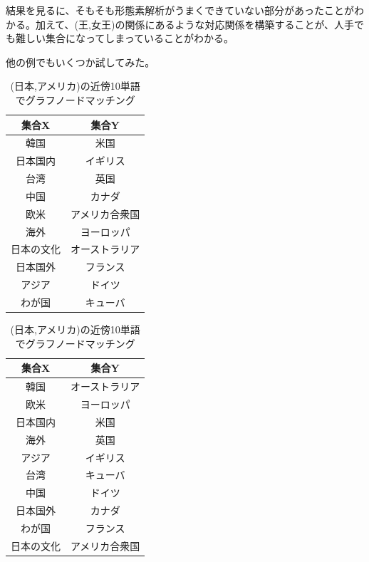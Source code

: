 結果を見るに、そもそも形態素解析がうまくできていない部分があったことがわかる。加えて、(王,女王)の関係にあるような対応関係を構築することが、人手でも難しい集合になってしまっていることがわかる。

他の例でもいくつか試してみた。
\begin{table}[!h]
  \begin{minipage}[t]{.45\textwidth}
    \caption[(日本,アメリカ)の近傍10単語]{(日本,アメリカ)の近傍10単語}
    \label{}
    \begin{center}
      \begin{tabular}{|c||c|} \hline
        集合X & 集合Y \\ \hline \hline
        韓国 & 米国 \\
        日本国内 & イギリス \\
        台湾 & 英国 \\
        中国 & カナダ \\
        欧米 & アメリカ合衆国 \\
        海外 & ヨーロッパ \\
        日本の文化 & オーストラリア \\
        日本国外 & フランス \\
        アジア & ドイツ \\
        わが国 & キューバ \\ \hline
      \end{tabular}
    \end{center}
  \end{minipage}
  \hfill
  \begin{minipage}[t]{.45\textwidth}
    \caption[(日本,アメリカ)の近傍10単語でグラフノードマッチング]{(日本,アメリカ)の近傍10単語でグラフノードマッチング}
    \label{}
    \begin{center}
      \begin{tabular}{|c||c|} \hline
        集合X & 集合Y \\ \hline \hline
        韓国 & オーストラリア \\
        欧米 & ヨーロッパ \\
        日本国内 & 米国 \\
        海外 & 英国 \\
        アジア & イギリス \\
        台湾 & キューバ \\
        中国 & ドイツ \\
        日本国外 & カナダ \\
        わが国 & フランス \\
        日本の文化 & アメリカ合衆国 \\ \hline
      \end{tabular}
    \end{center}
  \end{minipage}
\end{table}

